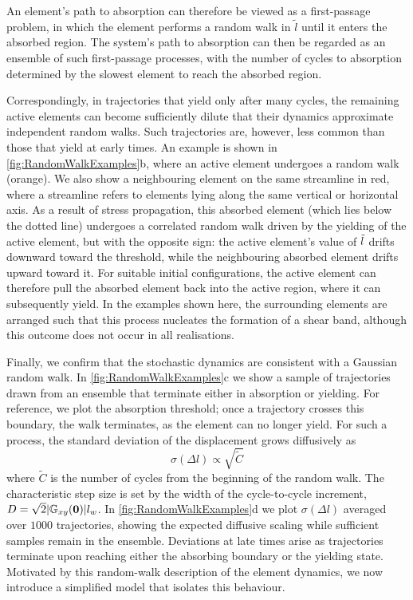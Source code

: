 An element’s path to absorption can therefore be viewed as a first-passage problem, in which the element performs a random walk in $\tilde l$ until it enters the absorbed region. The system’s path to absorption can then be regarded as an ensemble of such first-passage processes, with the number of cycles to absorption determined by the slowest element to reach the absorbed region.

Correspondingly, in trajectories that yield only after many cycles, the remaining active elements can become sufficiently dilute that their dynamics approximate independent random walks. Such trajectories are, however, less common than those that yield at early times. An example is shown in \cref{fig:RandomWalkExamples}b, where an active element undergoes a random walk (orange). We also show a neighbouring element on the same streamline in red, where a streamline refers to elements lying along the same vertical or horizontal axis. As a result of stress propagation, this absorbed element (which lies below the dotted line) undergoes a correlated random walk driven by the yielding of the active element, but with the opposite sign: the active element’s value of $\tilde{l}$ drifts downward toward the threshold, while the neighbouring absorbed element drifts upward toward it. For suitable initial configurations, the active element can therefore pull the absorbed element back into the active region, where it can subsequently yield. In the examples shown here, the surrounding elements are arranged such that this process nucleates the formation of a shear band, although this outcome does not occur in all realisations.

Finally, we confirm that the stochastic dynamics are consistent with a Gaussian random walk. In \cref{fig:RandomWalkExamples}c we show a sample of trajectories drawn from an ensemble that terminate either in absorption or yielding. For reference, we plot the absorption threshold; once a trajectory crosses this boundary, the walk terminates, as the element can no longer yield. For such a process, the standard deviation of the displacement grows diffusively as 
\[
    \sigma(\Delta l) \propto \sqrt{\tilde{C}}
\]
where $\tilde{C}$ is the number of cycles from the beginning of the random walk. The characteristic step size is set by the width of the cycle-to-cycle increment, $D=\sqrt{2}|\mathbb{G}_{xy}(\bm{0})|l_w$. In \cref{fig:RandomWalkExamples}d we plot $\sigma(\Delta l)$ averaged over $1000$ trajectories, showing the expected diffusive scaling while sufficient samples remain in the ensemble. Deviations at late times arise as trajectories terminate upon reaching either the absorbing boundary or the yielding state. Motivated by this random-walk description of the element dynamics, we now introduce a simplified model that isolates this behaviour.

